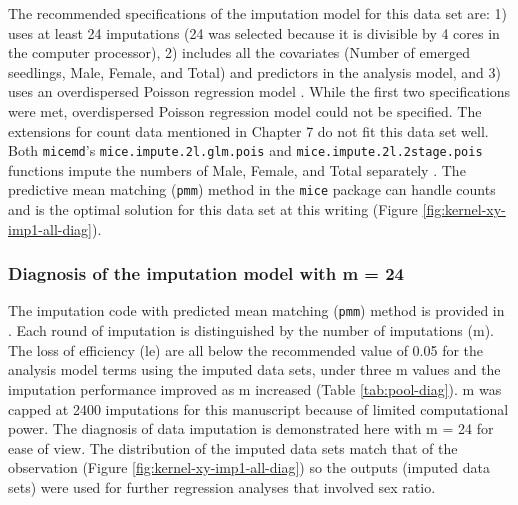 \documentclass[
]{article}
\begin{document}
The recommended specifications of the imputation model for this data set are: 1) uses at least 24 imputations (24 was selected because it is divisible by 4 cores in the computer processor), 2) includes all the covariates (Number of emerged seedlings, Male, Female, and Total) and predictors in the analysis model, and 3) uses an overdispersed Poisson regression model \citetext{\citealp{azurMultipleImputationChained2011}; \citealp{whiteMultipleImputationUsing2011}; \citealp[and][]{nguyenModelCheckingMultiple2017}}. While the first two specifications were met, overdispersed Poisson regression model could not be specified. The extensions for count data mentioned in Chapter 7 \citep{vanbuurenFlexibleImputationMissing2018} do not fit this data set well. Both \texttt{micemd}'s \texttt{mice.impute.2l.glm.pois} and \texttt{mice.impute.2l.2stage.pois} functions impute the numbers of Male, Female, and Total separately \citep{audigierMicemdMultipleImputation2019}. The predictive mean matching (\texttt{pmm}) method in the \texttt{mice} package can handle counts \citep{vanbuurenMiceMultivariateImputation2011} and is the optimal solution for this data set at this writing (Figure \ref{fig:kernel-xy-imp1-all-diag}).

\hypertarget{diagnosis-of-the-imputation-model-with-m-24}{%
\subsubsection*{Diagnosis of the imputation model with m = 24}\label{diagnosis-of-the-imputation-model-with-m-24}}

The imputation code with predicted mean matching (\texttt{pmm}) method is provided in \citep{nguyenDataImpactCropping2022}. Each round of imputation is distinguished by the number of imputations (m). The loss of efficiency (le) are all below the recommended value of 0.05 \citep{whiteMultipleImputationUsing2011} for the analysis model terms using the imputed data sets, under three m values and the imputation performance improved as m increased (Table \ref{tab:pool-diag}). m was capped at 2400 imputations for this manuscript because of limited computational power. The diagnosis of data imputation is demonstrated here with m = 24 for ease of view. The distribution of the imputed data sets match that of the observation (Figure \ref{fig:kernel-xy-imp1-all-diag}) so the outputs (imputed data sets) were used for further regression analyses that involved sex ratio.
\end{document}

